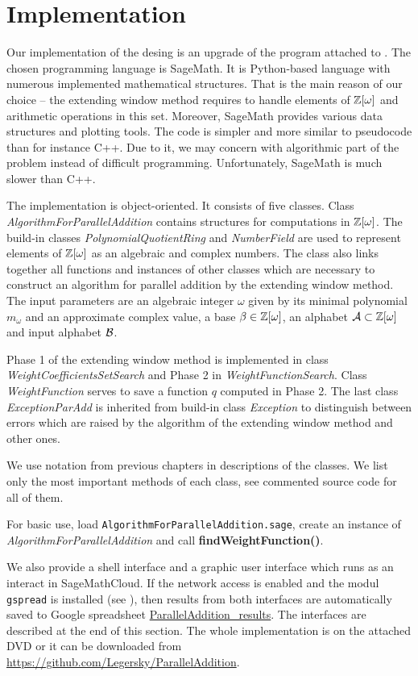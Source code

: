 \section{Implementation}

Our implementation of the desing is an upgrade of the program attached to \cite{vu}. The chosen programming language is SageMath. It is Python-based language with numerous implemented mathematical structures. That is the main reason of our choice -- the extending window method requires to handle elements of $\mathbb{Z}[\omega]$ and arithmetic operations in this set. Moreover, SageMath provides various data structures and plotting tools.  The code is simpler and more similar to pseudocode than for instance C++. Due to it, we may concern with algorithmic part of the problem instead of difficult programming. Unfortunately, SageMath is much slower than C++.


The implementation is object-oriented. It consists of five classes. Class \emph{AlgorithmForParallelAddition} contains structures for computations in $\mathbb{Z}[\omega]$. The build-in classes \emph{PolynomialQuotientRing} and \emph{NumberField} are used to represent elements of $\mathbb{Z}[\omega]$ as an algebraic and complex numbers. The class also links together all functions and instances of other classes which are necessary to construct an algorithm for parallel addition by the extending window method. The input parameters are an algebraic integer $\omega$ given by its minimal polynomial $m_\omega$ and an approximate complex value, a base $\beta\in\mathbb{Z}[\omega]$, an alphabet $\mathcal{A}\subset\mathbb{Z}[\omega]$ and input alphabet $\mathcal{B}$. 

Phase 1 of the extending window method is implemented in class \emph{WeightCoefficientsSetSearch} and Phase 2 in \emph{WeightFunctionSearch}. Class \emph{WeightFunction} serves to save a function $q$ computed in Phase 2. The last class \emph{ExceptionParAdd} is inherited from build-in class \emph{Exception} to distinguish between errors which are raised by the algorithm  of the extending window method and other ones.

We use notation from previous chapters in descriptions of the classes. We list only the most important methods of each class, see commented source code for all of them.  

For basic use, load \verb+AlgorithmForParallelAddition.sage+, create an instance of \emph{AlgorithmForParallelAddition} and call \textbf{findWeightFunction()}.

We also provide a shell interface and a graphic user interface which runs as an interact in SageMathCloud. If the network access is enabled and the modul \verb+gspread+ is installed (see \cite{gspread}), then results from both interfaces are automatically saved to Google spreadsheet \href{https://docs.google.com/spreadsheets/d/1TnhrHdefHfHa0WSeVs4q6XVj3epjPlPlnoekE0E1xeM/edit?usp=sharing}{ParallelAddition\_results}. The interfaces are described at the end of this section. The whole implementation is on the attached DVD or it can be downloaded from  \url{https://github.com/Legersky/ParallelAddition}.



